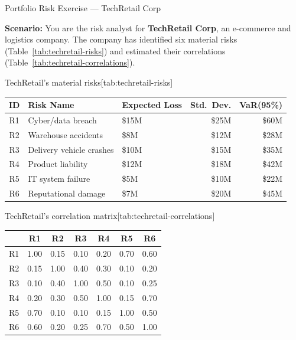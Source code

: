\documentclass[11pt,openany]{book}
\begin{document}
\begin{minicase}{Portfolio Risk Exercise --- TechRetail Corp}

\textbf{Scenario:} You are the risk analyst for \textbf{TechRetail Corp}, an
e-commerce and logistics company. The company has identified six material
risks (Table~\ref{tab:techretail-risks}) and estimated their correlations
(Table~\ref{tab:techretail-correlations}).

\begin{ermtable}{TechRetail's material risks}[tab:techretail-risks]
\begin{tabular}{@{}cllrr@{}}
\toprule
\textbf{ID} & \textbf{Risk Name} & \textbf{Expected Loss} &
\textbf{Std.\ Dev.} & \textbf{VaR(95\%)} \\
\midrule
R1 & Cyber/data breach        & \$15M & \$25M & \$60M \\
R2 & Warehouse accidents      & \$8M  & \$12M & \$28M \\
R3 & Delivery vehicle crashes & \$10M & \$15M & \$35M \\
R4 & Product liability        & \$12M & \$18M & \$42M \\
R5 & IT system failure        & \$5M  & \$10M & \$22M \\
R6 & Reputational damage      & \$7M  & \$20M & \$45M \\
\bottomrule
\end{tabular}
\end{ermtable}

\begin{ermtable}{TechRetail's correlation matrix}[tab:techretail-correlations]
\begin{tabular}{@{}lcccccc@{}}
\toprule
 & \textbf{R1} & \textbf{R2} & \textbf{R3} & \textbf{R4} & \textbf{R5} &
\textbf{R6} \\
\midrule
R1 & 1.00 & 0.15 & 0.10 & 0.20 & 0.70 & 0.60 \\
R2 & 0.15 & 1.00 & 0.40 & 0.30 & 0.10 & 0.20 \\
R3 & 0.10 & 0.40 & 1.00 & 0.50 & 0.10 & 0.25 \\
R4 & 0.20 & 0.30 & 0.50 & 1.00 & 0.15 & 0.70 \\
R5 & 0.70 & 0.10 & 0.10 & 0.15 & 1.00 & 0.50 \\
R6 & 0.60 & 0.20 & 0.25 & 0.70 & 0.50 & 1.00 \\
\bottomrule
\end{tabular}
\end{ermtable}


\end{minicase}
\end{document}
